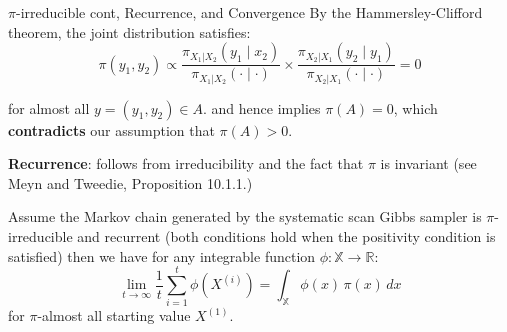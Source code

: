 \begin{frame}{$\pi$-irreducible cont, Recurrence, and Convergence}
By the Hammersley-Clifford theorem, the joint distribution satisfies:
\begin{equation}
\pi(y_1, y_2) \propto \frac{\pi_{X_1|X_2}(y_1 \mid x_2)}{\pi_{X_1|X_2}(\cdot \mid \cdot)} \times \frac{\pi_{X_2|X_1}(y_2 \mid y_1)}{\pi_{X_2|X_1}(\cdot \mid \cdot)} = 0
\end{equation}

for almost all $y = (y_1, y_2) \in A$.
and hence implies $\pi(A) = 0$, which \textbf{contradicts} our assumption that $\pi(A) > 0$.


\textbf{Recurrence}: follows from irreducibility and the fact that $\pi$ is
invariant (see Meyn and Tweedie, Proposition 10.1.1.)

Assume the Markov chain generated by the systematic scan Gibbs sampler is $\pi$-irreducible and recurrent (both conditions hold when the positivity condition is satisfied) then we have for any integrable function $\phi : \mathbb{X} \to \mathbb{R}$:
\[
\lim_{t \to \infty} \frac{1}{t} \sum_{i=1}^{t} \phi\left(X^{(i)}\right) = \int_{\mathbb{X}} \phi(x) \, \pi(x) \, dx
\]
for $\pi$-almost all starting value $X^{(1)}$.

\end{frame}